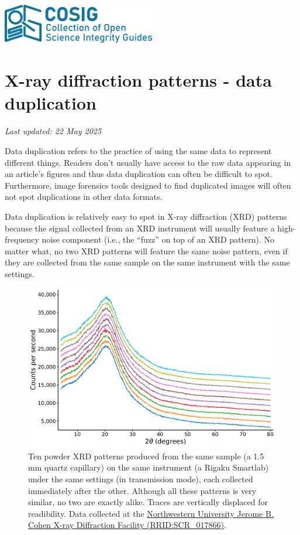\documentclass[letterpaper, 12pt]{article}
\begin{document}
\flushleft
\includegraphics[width=0.5\textwidth]{img/home/241017_final_logo_mockup.png}

\section*{X-ray diffraction patterns - data duplication}
\textit{Last updated: 22 May 2025}

Data duplication refers to the practice of using the same data to represent different things. Readers don't usually have access to the raw data appearing in an article's figures and thus data duplication can often be difficult to spot. Furthermore, image forensics tools designed to find duplicated images will often not spot duplications in other data formats.

Data duplication is relatively easy to spot in X-ray diffraction (XRD) patterns because the signal collected from an XRD instrument will usually feature a high-frequency noise component (i.e., the ``fuzz'' on top of an XRD pattern). No matter what, no two XRD patterns will feature the same noise pattern, even if they are collected from the same sample on the same instrument with the same settings.

\begin{figure}[h!tbp]
    \centering
    \includegraphics[width=\textwidth]{img/xrd_data_duplication/250519_xrd_x10.pdf}
    \caption*{Ten powder XRD patterns produced from the same sample (a 1.5 mm quartz capillary) on the same instrument (a Rigaku Smartlab) under the same settings (in transmission mode), each collected immediately after the other. Although all these patterns is very similar, no two are exactly alike. Traces are vertically displaced for readibility. Data collected at the \href{https://www.xray.facilities.northwestern.edu/}{Northwestern University Jerome B. Cohen X-ray Diffraction Facility (RRID:SCR\_017866)}.}
\end{figure}
\end{document}
